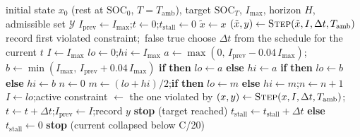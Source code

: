 \documentclass[11pt]{article}
\newcommand{\Tamb}{T_{\mathrm{amb}}}
\newcommand{\unit}[1]{\,\mathrm{#1}}
\begin{document}
\begin{algorithm}[H]
\caption{Closed-loop charge with the scalar reference governor (and CC-CV)}\label{alg:rg}
\begin{algorithmic}[1]
\Require initial state $x_0$ (rest at $\mathrm{SOC}_0$, $T=\Tamb$), target $\mathrm{SOC}_T$, $I_{\max}$, horizon $H$, admissible set $\mathcal Y$
\State $I_{\mathrm{prev}}\gets I_{\max}$;\quad $t\gets0$;\quad $t_{\mathrm{stall}}\gets0$
 
  \State $\tilde x\gets x$
    \State $(\tilde x,y)\gets\textsc{Step}(\tilde x,I,\Delta t,\Tamb)$
     \State record first violated constraint;\ \Return false \EndIf
  \EndFor
  \State \Return true
\EndFunction
{}
  \State choose $\Delta t$ from the schedule for the current $t$
    \State $I\gets I_{\max}$ 
  \Else
    \State $lo\gets0$;\quad $hi\gets I_{\max}$
    \State $a\gets\max(0,\,I_{\mathrm{prev}}-0.04\,I_{\max})$;\quad $b\gets\min(I_{\max},\,I_{\mathrm{prev}}+0.04\,I_{\max})$ 
     \textbf{if}  \textbf{then} $lo\gets a$ \textbf{else} $hi\gets a$ \EndIf
     \textbf{if}  \textbf{then} $lo\gets b$ \textbf{else} $hi\gets b$ \EndIf
    \State $n\gets0$
      \State $m\gets(lo+hi)/2$;\quad \textbf{if}  \textbf{then} $lo\gets m$ \textbf{else} $hi\gets m$;\quad $n\gets n+1$
    \EndWhile
    \State $I\gets lo$;\quad active constraint $\gets$ the one violated by 
  \EndIf
  \State $(x,y)\gets\textsc{Step}(x,I,\Delta t,\Tamb)$;\quad $t\gets t+\Delta t$;\quad $I_{\mathrm{prev}}\gets I$;\quad record $y$
   \textbf{stop} (target reached) \EndIf
   $t_{\mathrm{stall}}\gets t_{\mathrm{stall}}+\Delta t$ \textbf{else} $t_{\mathrm{stall}}\gets0$ \EndIf
  \If{$t_{\mathrm{stall}}\ge120\unit{s}$} \textbf{stop} (current collapsed below C/20) \EndIf
\EndWhile
\end{algorithmic}
\end{algorithm}
\end{document}
